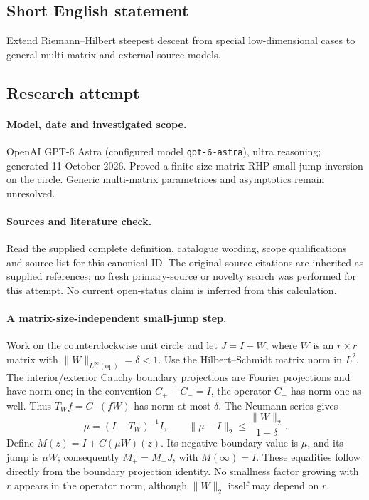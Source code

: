 \documentclass[11pt]{article}
\begin{document}
\subsection{Short English statement}
Extend Riemann--Hilbert steepest descent from special low-dimensional cases to general multi-matrix and external-source models.
\subsection{Research attempt}
\paragraph{Model, date and investigated scope.}
OpenAI GPT-6 Astra (configured model \texttt{gpt-6-astra}), ultra reasoning; generated 11 October 2026. Proved a finite-size matrix RHP small-jump inversion on the circle. Generic multi-matrix parametrices and asymptotics remain unresolved.

\paragraph{Sources and literature check.}
Read the supplied complete definition, catalogue wording, scope qualifications and source list for this canonical ID. The original-source citations are inherited as supplied references; no fresh primary-source or novelty search was performed for this attempt. No current open-status claim is inferred from this calculation.

\paragraph{A matrix-size-independent small-jump step.}Work on the counterclockwise unit circle and let \(J=I+W\), where \(W\) is an \(r\times r\) matrix with \(\|W\|_{L^\infty(\mathrm{op})}=\delta<1\). Use the Hilbert--Schmidt matrix norm in \(L^2\). The interior/exterior Cauchy boundary projections are Fourier projections and have norm one; in the convention \(C_+-C_-=I\), the operator \(C_-\) has norm one as well. Thus \(T_Wf=C_-(fW)\) has norm at most \(\delta\). The Neumann series gives
\[\mu=(I-T_W)^{-1}I,\qquad \|\mu-I\|_2\le\frac{\|W\|_2}{1-\delta}.
\]
Define \(M(z)=I+C(\mu W)(z)\). Its negative boundary value is \(\mu\), and its jump is \(\mu W\); consequently \(M_+=M_-J\), with \(M(\infty)=I\). These equalities follow directly from the boundary projection identity. No smallness factor growing with \(r\) appears in the operator norm, although \(\|W\|_2\) itself may depend on \(r\).
\end{document}
